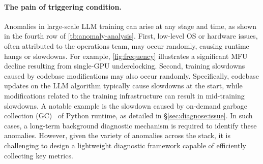 \paragraph{The pain of triggering condition.}
Anomalies in large-scale LLM training can arise at any stage and time, as shown in the fourth row of \autoref{tb:anomaly-analysis}. First, low-level OS or hardware issues, often attributed to the operations team, may occur randomly, causing runtime hangs or slowdowns. For example, \autoref{fig:frequency} illustrates a significant MFU decline resulting from single-GPU underclocking. Second, training slowdowns caused by codebase modifications may also occur randomly. Specifically, codebase updates on the LLM algorithm typically cause slowdowns at the start, while modifications related to the training infrastructure can result in mid-training slowdowns. A notable example is the slowdown caused by on-demand garbage collection (GC)~\cite{jiangMegaScaleScaling} of Python runtime, as detailed in \S\ref{sec:diagnose:issue}.
In such cases, a long-term background diagnostic mechanism is required to identify these anomalies. However, given the variety of anomalies across the stack, it is challenging to design a lightweight diagnostic framework capable of efficiently collecting key metrics.




